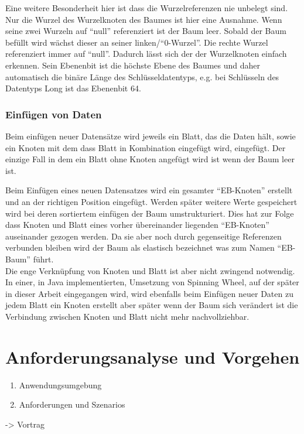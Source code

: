 \documentclass[a4paper,11pt,oneside,%
headsepline,												%
footsepline,												%
bibtotocnumbered									%
]{scrreprt}
\begin{document}
Eine weitere Besonderheit hier ist dass die Wurzelreferenzen nie unbelegt sind. Nur die Wurzel des Wurzelknoten des Baumes ist hier eine Ausnahme. Wenn seine zwei Wurzeln auf \enquote{null} referenziert ist der Baum leer. Sobald der Baum befüllt wird wächst dieser an seiner linken/\enquote{0-Wurzel}. Die rechte Wurzel referenziert immer auf \enquote{null}. Dadurch lässt sich der der Wurzelknoten einfach erkennen.
Sein Ebenenbit ist die höchste Ebene des Baumes und daher automatisch die binäre Länge des Schlüsseldatentyps, e.g. bei Schlüsseln des Datentyps Long ist das Ebenenbit 64.\\

\subsection{Einfügen von Daten}
Beim einfügen neuer Datensätze wird jeweils ein Blatt, das die Daten hält, sowie ein Knoten mit dem dass Blatt in Kombination eingefügt wird, eingefügt. Der einzige Fall in dem ein Blatt ohne Knoten angefügt wird ist wenn der Baum leer ist.

Beim Einfügen eines neuen Datensatzes wird ein gesamter \enquote{EB-Knoten} erstellt und an der richtigen Position eingefügt. Werden später weitere Werte gespeichert wird bei deren sortiertem einfügen der Baum umstrukturiert. Dies hat zur Folge dass Knoten und Blatt eines vorher übereinander liegenden \enquote{EB-Knoten} auseinander gezogen werden. Da sie aber noch durch gegenseitige Referenzen verbunden bleiben wird der Baum als elastisch bezeichnet was zum Namen \enquote{\ac{EB-Baum}} führt.\\
Die enge Verknüpfung von Knoten und Blatt ist aber nicht zwingend notwendig. In einer, in Java implementierten, Umsetzung von Spinning Wheel, auf der später in dieser Arbeit eingegangen wird, wird ebenfalls beim Einfügen neuer Daten zu jedem Blatt ein Knoten erstellt aber später wenn der Baum sich verändert ist die Verbindung zwischen Knoten und Blatt nicht mehr nachvollziehbar.


 
\chapter{Anforderungsanalyse und Vorgehen}
\begin{enumerate}[1.]
			\item Anwendungsumgebung
			\item Anforderungen und Szenarios
		\end{enumerate}
-> Vortrag
\end{document}
